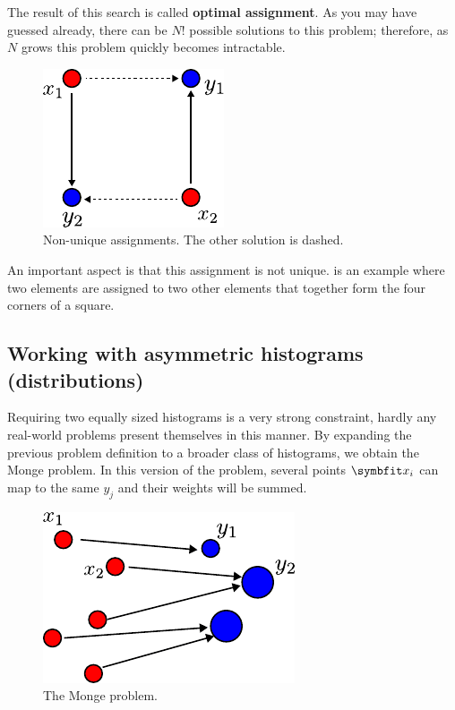 The result of this search is called \textbf{optimal assignment}. As you may have guessed already, there can be $N!$ possible solutions to this problem; therefore, as $N$ grows this problem quickly becomes intractable.

\begin{figure}
    \centering
    \includegraphics{chapters/assets/ot/monge1.pdf}
    \caption{Non-unique assignments. The other solution is dashed.}
    \label{fig:ot-non-uniq}
\end{figure}

An important aspect is that this assignment is not unique.  is an example where two elements are assigned to two other elements that together form the four corners of a square.

\subsection{Working with asymmetric histograms (distributions)}\label{ssec:ot-assym}

Requiring two equally sized histograms is a very strong constraint, hardly any real-world problems present themselves in this manner. By expanding the previous problem definition to a broader class of histograms, we obtain the Monge problem. In this version of the problem, several points $\bfitx_i$ can map to the same $y_j$ and their weights will be summed.

\begin{figure}[ht]
    \centering
    \includegraphics{chapters/assets/ot/monge2.pdf}
    \caption{The Monge problem.}
    \label{fig:ot-assym}
\end{figure}

